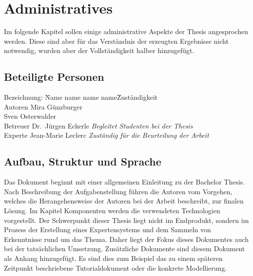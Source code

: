 \chapter{Administratives}
\label{chap:administratives}

Im folgende Kapitel sollen einige administrative Aspekte der Thesis angesprochen werden. Diese sind aber für das Verständnis der erzeugten Ergebnisse nicht notwendig, wurden aber der Vollständigkeit halber hinzugefügt.

\section{Beteiligte Personen}
\label{sec:admin_beteiligte}
\begin{tabbing} %
Bezeichnung: \= Name name name name\= Zuständigkeit \kill \\
    Autoren         \> Mira Günzburger\protect\footnotemark[1]{}    \> \\
                    \> Sven Osterwalder\protect\footnotemark[2]{} \> \\
    Betreuer        \> Dr.\ Jürgen Eckerle\protect\footnotemark[3]{}  \> \textit{Begleitet Studenten bei der Thesis}\\
    Experte         \> Jean-Marie Leclerc   \> \textit{Zuständig für die Beurteilung der Arbeit}
\end{tabbing}

\section{Aufbau, Struktur und Sprache}
\label{sec:admin_aufbau}
Das Dokument beginnt mit einer allgemeinen Einleitung zu der Bachelor Thesis. Nach Beschreibung der Aufgabenstellung führen die Autoren vom Vorgehen, welches die Herangehensweise der Autoren bei der Arbeit beschreibt, zur finalen Lösung. Im Kapitel Komponenten werden die verwendeten Technologien vorgestellt. Der Schwerpunkt dieser Thesis liegt nicht im Endprodukt,  sondern im Prozess der Erstellung eines Expertensystems und dem Sammeln von Erkenntnisse rund um das Thema. Daher liegt der Fokus dieses Dokumentes auch bei der tatsächlichen Umsetzung. Zusätzliche Dokumente sind diesem Dokument als Anhang hinzugefügt. Es sind dies zum Beispiel das zu einem späteren Zeitpunkt beschriebene Tutorialdokument oder die konkrete Modellierung.

